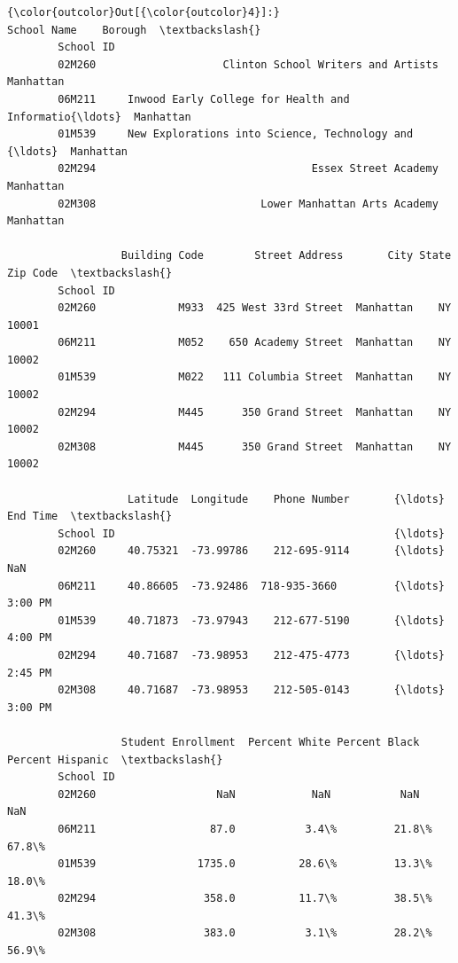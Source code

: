 \documentclass[11pt]{article}
\begin{document}
\begin{Verbatim}[commandchars=\\\{\}]
{\color{outcolor}Out[{\color{outcolor}4}]:}                                                  School Name    Borough  \textbackslash{}
        School ID                                                                 
        02M260                    Clinton School Writers and Artists  Manhattan   
        06M211     Inwood Early College for Health and Informatio{\ldots}  Manhattan   
        01M539     New Explorations into Science, Technology and {\ldots}  Manhattan   
        02M294                                  Essex Street Academy  Manhattan   
        02M308                          Lower Manhattan Arts Academy  Manhattan   
        
                  Building Code        Street Address       City State  Zip Code  \textbackslash{}
        School ID                                                                  
        02M260             M933  425 West 33rd Street  Manhattan    NY     10001   
        06M211             M052    650 Academy Street  Manhattan    NY     10002   
        01M539             M022   111 Columbia Street  Manhattan    NY     10002   
        02M294             M445      350 Grand Street  Manhattan    NY     10002   
        02M308             M445      350 Grand Street  Manhattan    NY     10002   
        
                   Latitude  Longitude    Phone Number       {\ldots}       End Time  \textbackslash{}
        School ID                                            {\ldots}                  
        02M260     40.75321  -73.99786    212-695-9114       {\ldots}            NaN   
        06M211     40.86605  -73.92486  718-935-3660         {\ldots}        3:00 PM   
        01M539     40.71873  -73.97943    212-677-5190       {\ldots}        4:00 PM   
        02M294     40.71687  -73.98953    212-475-4773       {\ldots}        2:45 PM   
        02M308     40.71687  -73.98953    212-505-0143       {\ldots}        3:00 PM   
        
                  Student Enrollment  Percent White Percent Black Percent Hispanic  \textbackslash{}
        School ID                                                                    
        02M260                   NaN            NaN           NaN              NaN   
        06M211                  87.0           3.4\%         21.8\%            67.8\%   
        01M539                1735.0          28.6\%         13.3\%            18.0\%   
        02M294                 358.0          11.7\%         38.5\%            41.3\%   
        02M308                 383.0           3.1\%         28.2\%            56.9\%   
        

\end{Verbatim}
\end{document}
